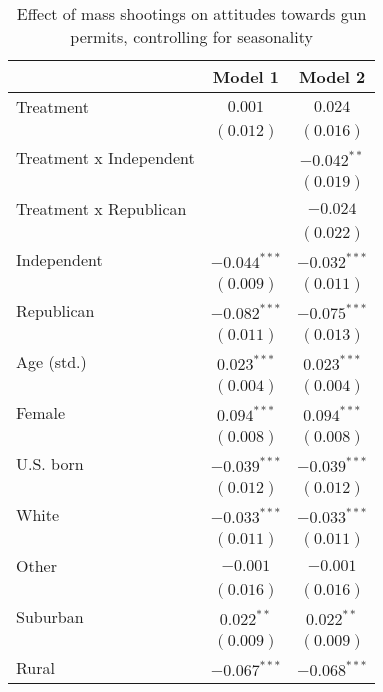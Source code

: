 
\begin{table}
\caption{Effect of mass shootings on attitudes towards gun permits, controlling for seasonality}
\begin{center}
\begin{tabular}{l c c}
\toprule
 & Model 1 & Model 2 \\
\midrule
Treatment               & $0.001$        & $0.024$        \\
                        & $(0.012)$      & $(0.016)$      \\
Treatment x Independent &                & $-0.042^{**}$  \\
                        &                & $(0.019)$      \\
Treatment x Republican  &                & $-0.024$       \\
                        &                & $(0.022)$      \\
Independent             & $-0.044^{***}$ & $-0.032^{***}$ \\
                        & $(0.009)$      & $(0.011)$      \\
Republican              & $-0.082^{***}$ & $-0.075^{***}$ \\
                        & $(0.011)$      & $(0.013)$      \\
Age (std.)              & $0.023^{***}$  & $0.023^{***}$  \\
                        & $(0.004)$      & $(0.004)$      \\
Female                  & $0.094^{***}$  & $0.094^{***}$  \\
                        & $(0.008)$      & $(0.008)$      \\
U.S. born               & $-0.039^{***}$ & $-0.039^{***}$ \\
                        & $(0.012)$      & $(0.012)$      \\
White                   & $-0.033^{***}$ & $-0.033^{***}$ \\
                        & $(0.011)$      & $(0.011)$      \\
Other                   & $-0.001$       & $-0.001$       \\
                        & $(0.016)$      & $(0.016)$      \\
Suburban                & $0.022^{**}$   & $0.022^{**}$   \\
                        & $(0.009)$      & $(0.009)$      \\
Rural                   & $-0.067^{***}$ & $-0.068^{***}$ \\

\end{tabular}
\end{center}
\end{table}
